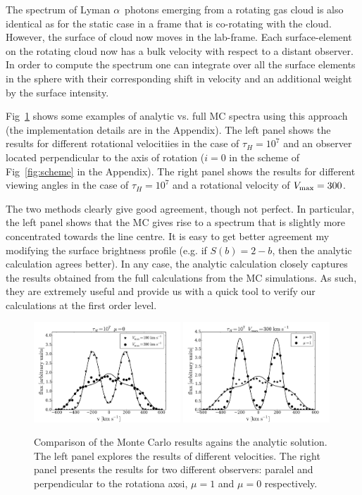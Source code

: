 \documentclass{emulateapj}
\newcommand{\lya}{{Lyman $\alpha$~}}
\newcommand{\kms}{{\ifmmode{{\mathrm{\,km\ s}^{-1}}}\else{\,km~s$^{-1}$}\fi}}
\begin{document}
The spectrum of \lya photons emerging from a rotating gas cloud is
also identical as for the static case in a frame that is co-rotating
with the cloud. However, the surface of cloud now moves in the
lab-frame. Each surface-element on the rotating cloud now has a bulk
velocity with respect to a distant observer. In order to compute the
spectrum one can integrate over all the surface elements in the
sphere with their corresponding shift in velocity and an additional
weight by the surface intensity.


Fig~\ref{fig:comparison} shows some examples of analytic vs. full MC
spectra using this approach (the implementation details are in the Appendix).
The left panel shows the results for different rotational velocitiies
in the case of $\tau_{H}=10^7$ and an observer located perpendicular
to the axis of rotation ($i=0$ in the scheme of Fig~\ref{fig:scheme}
in the Appendix). 
The right panel shows the results for different viewing angles in the
case of $\tau_{H}=10^7$ and a rotational velocity of $V_{\rm
  max}=300$\kms. 

The two methods clearly give good agreement, though not perfect. In
particular, the left panel shows that the MC gives rise to a spectrum that is
slightly more concentrated towards the line centre. 
It is easy to get better agreement my modifying the surface brightness
profile (e.g. if $S(b)=2-b$, then the analytic calculation agrees
better).
In any case, the analytic calculation closely captures the results
obtained from the full calculations from the MC simulations.  
As such, they are extremely useful and provide us with a quick tool to
verify our calculations at the first order level. 


\begin{figure}
\begin{center}
  \includegraphics[width=0.49\textwidth]{fig10a.pdf}
  \includegraphics[width=0.49\textwidth]{fig10b.pdf}
\end{center}
\caption{
Comparison of the Monte Carlo results agains the analytic
solution. The left panel explores the results of different velocities.
The right panel presents the results for two different observers:
paralel and perpendicular to the rotationa axsi, $\mu=1$ and $\mu=0$
respectively.
\label{fig:comparison} }   
\end{figure}
\end{document}
